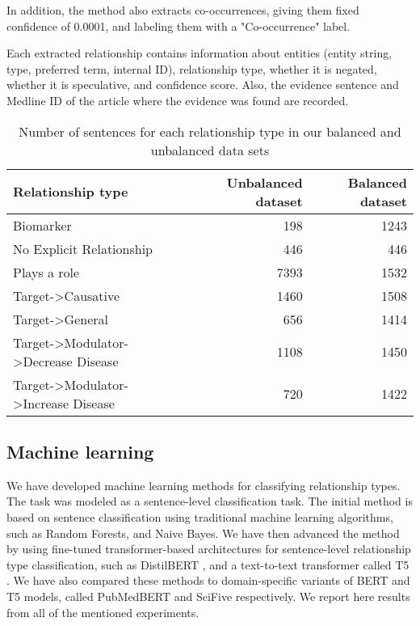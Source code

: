 \documentclass[final,12pt,3p,times,twocolumn,authoryear]{elsarticle}
\begin{document}
In addition, the method also extracts co-occurrences, giving them fixed confidence of 0.0001, and labeling them with a "Co-occurrence" label. 

Each extracted relationship contains information about entities (entity string, type, preferred term, internal ID), relationship type, whether it is negated, whether it is speculative, and confidence score. Also, the evidence sentence and Medline ID of the article where the evidence was found are recorded.

\begin{table*}[h!]
    \centering
    \begin{tabular}{|l|r|r|}
    \hline
        Relationship type & Unbalanced dataset & Balanced dataset  \\ \hline
         Biomarker & 198 & 1243  \\
       No Explicit Relationship   & 446 & 446 \\
         Plays a role & 7393 & 1532 \\
         Target-\textgreater Causative  & 1460 & 1508 \\
        Target-\textgreater General        & 656 & 1414  \\
         Target-\textgreater Modulator-\textgreater Decrease Disease & 1108 & 1450  \\
         Target-\textgreater Modulator-\textgreater Increase Disease   & 720 & 1422  \\
        \hline
        
    \end{tabular}
    \caption{Number of sentences for each relationship type in our balanced and unbalanced data sets}
    \label{tab:dataset_stats}
\end{table*} 


\subsection{Machine learning}

We have developed machine learning methods for classifying relationship types. The task was modeled as a sentence-level classification task.  The initial method is based on sentence classification using traditional machine learning algorithms, such as Random Forests, and Naive Bayes. We have then advanced the method by using fine-tuned transformer-based architectures for sentence-level relationship type classification, such as DistilBERT \citep{sanh2019distilbert}, and a text-to-text transformer called T5 \citep{raffel2020exploring}. We have also compared these methods to domain-specific variants of BERT and T5 models, called PubMedBERT \citep{gu2021domain} and SciFive \citep{phan2021scifive} respectively.  We report here results from all of the mentioned experiments. 
\end{document}
